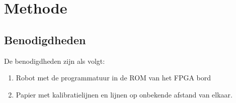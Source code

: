 \documentclass[a4paper]{article}
\begin{document}
\section{Methode}
\subsection{Benodigdheden}
De benodigdheden zijn als volgt:
\begin{enumerate}
\item Robot met de programmatuur in de ROM van het FPGA bord
\item Papier met kalibratielijnen en lijnen op onbekende afstand van elkaar.
\end{enumerate}
\end{document}
